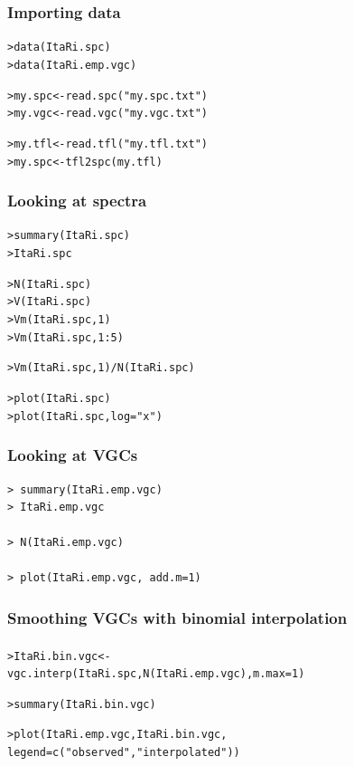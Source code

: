\documentclass[t]{beamer} %
\begin{document}
\begin{frame}[fragile]
  \frametitle{Importing data}

\begin{alltt}
> data(ItaRi.spc)     
> data(ItaRi.emp.vgc)

> my.spc <- read.spc("my.spc.txt")
> my.vgc <- read.vgc("my.vgc.txt")

> my.tfl <- read.tfl("my.tfl.txt")
> my.spc <- tfl2spc(my.tfl) 
\end{alltt}

\end{frame}

\begin{frame}[fragile]
  \frametitle{Looking at spectra}

\begin{alltt}
> summary(ItaRi.spc)
> ItaRi.spc

> N(ItaRi.spc)
> V(ItaRi.spc)
> Vm(ItaRi.spc, 1)
> Vm(ItaRi.spc, 1:5)

> Vm(ItaRi.spc, 1) / N(ItaRi.spc)

> plot(ItaRi.spc)
> plot(ItaRi.spc, log="x")
\end{alltt}
\end{frame}

\begin{frame}[fragile]
  \frametitle{Looking at VGCs}

\begin{verbatim}
> summary(ItaRi.emp.vgc)
> ItaRi.emp.vgc

> N(ItaRi.emp.vgc)

> plot(ItaRi.emp.vgc, add.m=1)
\end{verbatim}
\end{frame}

\begin{frame}[fragile]
  \frametitle{Smoothing VGCs with binomial interpolation}
  \framesubtitle{\citep[for details, see][Sec. 2.6.1]{Baayen:01}}

\begin{alltt}
> ItaRi.bin.vgc <- 
  vgc.interp(ItaRi.spc, N(ItaRi.emp.vgc), m.max=1)

> summary(ItaRi.bin.vgc)

> plot(ItaRi.emp.vgc, ItaRi.bin.vgc,
       legend=c("observed", "interpolated"))
\end{alltt}


\end{frame}
\end{document}

